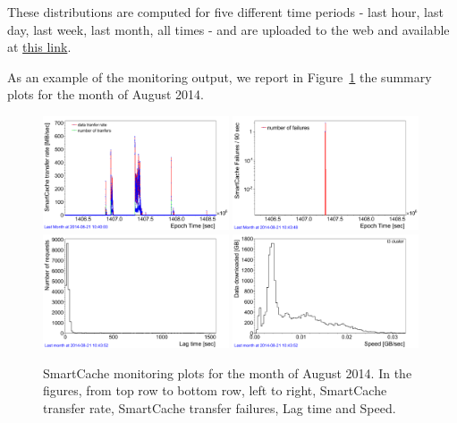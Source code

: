 These distributions are computed for five different time periods - last hour, last day, last week, last month, all times - 
and are uploaded to the web and available at 
\href{http://t3serv001.mit.edu/~paus/plots/}{\textcolor{Mahogany}{this link}}.

As an example of the monitoring output, we report in Figure~\ref{fig:SmartCache} the summary plots for the month of
August 2014. 

\begin{figure}[htbp]
 \centering
 \includegraphics[angle=0,width=0.49\textwidth]{plots/transferRateLastMonth.png}
 \includegraphics[angle=0,width=0.49\textwidth]{plots/failuresLastMonth.png}
 \includegraphics[angle=0,width=0.49\textwidth]{plots/lagTimeLastMonth.png}
 \includegraphics[angle=0,width=0.49\textwidth]{plots/downloadSpeedLastMonth.png}
 \caption{SmartCache monitoring plots for the month of August 2014. In the figures, from top row to bottom row, left to right,
 SmartCache transfer rate, SmartCache transfer failures, Lag time and Speed.}
 \label{fig:SmartCache}
\end{figure}


